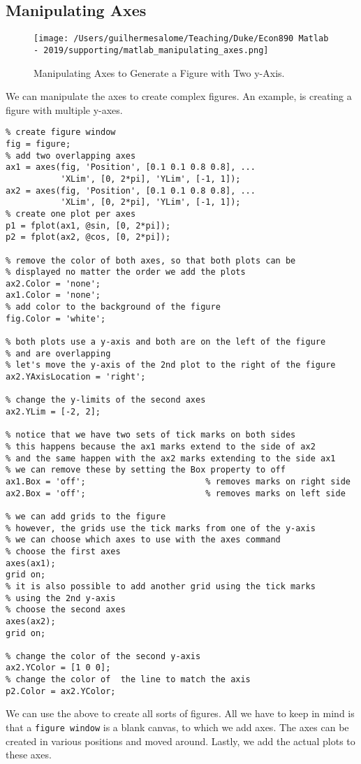 \documentclass[12pt, a4paper]{article}
\begin{document}
\subsection{Manipulating Axes}
\label{sec:org19bfa40}
\begin{figure}[H]
\centering
\texttt{[image: /Users/guilhermesalome/Teaching/Duke/Econ890 Matlab - 2019/supporting/matlab\_manipulating\_axes.png]}
\caption{\label{fig:orgdd93b42}
Manipulating Axes to Generate a Figure with Two y-Axis.}
\end{figure}

We can manipulate the axes to create complex figures.
An example, is creating a figure with multiple y-axes.
\lstset{language=matlab,label= ,caption= ,captionpos=b,firstnumber=1,numbers=left,style=Matlab-editor}
\begin{lstlisting}
% create figure window
fig = figure;
% add two overlapping axes
ax1 = axes(fig, 'Position', [0.1 0.1 0.8 0.8], ...
           'XLim', [0, 2*pi], 'YLim', [-1, 1]);
ax2 = axes(fig, 'Position', [0.1 0.1 0.8 0.8], ...
           'XLim', [0, 2*pi], 'YLim', [-1, 1]);
% create one plot per axes
p1 = fplot(ax1, @sin, [0, 2*pi]);
p2 = fplot(ax2, @cos, [0, 2*pi]);

% remove the color of both axes, so that both plots can be
% displayed no matter the order we add the plots
ax2.Color = 'none';
ax1.Color = 'none';
% add color to the background of the figure
fig.Color = 'white';

% both plots use a y-axis and both are on the left of the figure
% and are overlapping
% let's move the y-axis of the 2nd plot to the right of the figure
ax2.YAxisLocation = 'right';

% change the y-limits of the second axes
ax2.YLim = [-2, 2];

% notice that we have two sets of tick marks on both sides
% this happens because the ax1 marks extend to the side of ax2
% and the same happen with the ax2 marks extending to the side ax1
% we can remove these by setting the Box property to off
ax1.Box = 'off';                        % removes marks on right side
ax2.Box = 'off';                        % removes marks on left side

% we can add grids to the figure
% however, the grids use the tick marks from one of the y-axis
% we can choose which axes to use with the axes command
% choose the first axes
axes(ax1);
grid on;
% it is also possible to add another grid using the tick marks
% using the 2nd y-axis
% choose the second axes
axes(ax2);
grid on;

% change the color of the second y-axis
ax2.YColor = [1 0 0];
% change the color of  the line to match the axis
p2.Color = ax2.YColor;
\end{lstlisting}
We can use the above to create all sorts of figures.
All we have to keep in mind is that a \texttt{figure window} is a blank canvas, to which we add axes.
The axes can be created in various positions and moved around.
Lastly, we add the actual plots to these axes.
\end{document}
